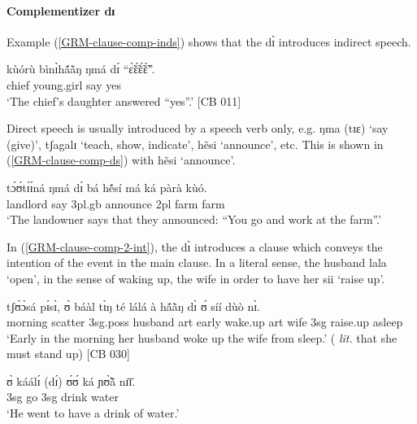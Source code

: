 \paragraph{Complementizer dɪ}
\label{GRM-clause-comp-di}

Example (\ref{GRM-clause-comp-inds}) shows that the  {\sls dɪ̀}
introduces indirect speech. 

\begin{exe}
 \ex\label{GRM-clause-comp-inds}
 \gll kùórù   bìnɪ̀hã́ã̀ŋ    ŋmá   dɪ́  ``ɛ̃̀ɛ̃́ɛ̃́ɛ̃̀''.\\
 chief   young.girl   say   {\comp} yes\\
 \glt  `The chief's daughter answered ``yes''.'  [CB 011] 
 \z

Direct speech is usually introduced by a speech verb only, e.g. {\sls ŋma (tɪɛ)} `say (give)',   {\sls tʃagalɪ} `teach, show, indicate', {\sls hẽsi} `announce', etc.  This is shown in (\ref{GRM-clause-comp-ds}) with {\sls hẽsi} `announce'.

\begin{exe}
 \ex\label{GRM-clause-comp-ds}
 \gll tɔ́ʊ́tɪ́ɪ́ná ŋmá dɪ́ bá hẽ́sí má ká pàrà kùó.\\
 landlord say  {\comp} {\sc 3pl.g}b  announce {\sc 2pl} {\egr} farm farm\\
 \glt  `The landowner says that they announced:  ``You go and work at the
farm''.' 
 \z
 

In (\ref{GRM-clause-comp-2-int}),  the  {\sls dɪ̀} introduces a clause which conveys the intention of the event in the main clause. In a literal sense, the husband  {\sls lala}  `open', in the sense of waking up,  the wife in order to  have her {\sls sii} `raise up'. 
\ea\label{GRM-clause-comp-2}

 \ea\label{GRM-clause-comp-2-int}
\gll  tʃʊ̀ɔ̀sá   pɪ́sɪ̀, ʊ̀   báàl tɪ̀ŋ té lálá à hã́ã̀ŋ    dɪ̀  ʊ́   síí  dùò nɪ̀.\\
  morning scatter    {\sc 3sg.poss}   husband  {\sc art} early  wake.up 
{\sc art}  wife   {\comp}   {\sc 3sg}   raise.up asleep  {\postp}\\
 \glt  `Early in the morning her husband woke up the wife from sleep.' ({\it
lit.} that she must stand up)  [CB 030]

 \ex\label{GRM-clause-comp-2-pur}
 \gll ʊ̀ káálɪ́ (dɪ́) ʊ́ʊ́ ká ɲʊ̃̀ã̀ nɪ̄ɪ̄.\\
{\sc 3sg} go   {\comp}  {\sc 3sg}   {\egr} drink  water\\
 \glt  `He went to have a drink of water.' 
 

\end{exe}
\end{exe}

